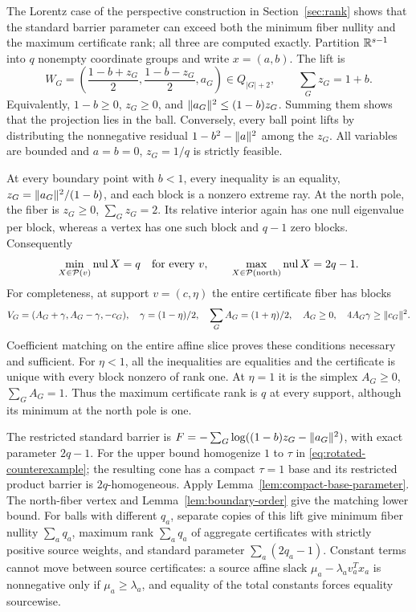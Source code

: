 \begin{example}
\label{ex:rotated-nullity}
The Lorentz case of the perspective construction in
Section~\ref{sec:rank} shows that the standard barrier parameter can
exceed both the minimum fiber nullity and the maximum certificate rank;
all three are computed exactly. Partition
$\mathbb R^{s-1}$ into $q$ nonempty coordinate groups and write $x=(a,b)$.
The lift is
\begin{equation}\label{eq:rotated-counterexample}
 W_G=\left(\frac{1-b+z_G}2,\frac{1-b-z_G}2,a_G\right)\in Q_{|G|+2},
 \qquad\sum_Gz_G=1+b.
\end{equation}
Equivalently, $1-b\geq0$, $z_G\geq0$, and
$\lVert a_G\rVert^2\leq(1-b)z_G$. Summing them shows that the projection lies
in the ball. Conversely, every ball point lifts by distributing the nonnegative residual $1-b^2-\lVert a\rVert^2$
among the $z_G$. All variables are bounded and $a=b=0$, $z_G=1/q$
is strictly feasible.

At every boundary point with $b<1$, every inequality is an equality,
$z_G=\lVert a_G\rVert^2/(1-b)$, and each block is a nonzero extreme ray.
At the north pole, the fiber is $z_G\geq0$, $\sum_Gz_G=2$.
Its relative interior again has one null eigenvalue per block, whereas
a vertex has one such block and $q-1$ zero blocks. Consequently
\[
 \min_{X\in\mathcal P(v)}\operatorname{nul}X=q
 \quad\hbox{for every }v,\qquad
 \max_{X\in\mathcal P(\text{north})}\operatorname{nul}X=2q-1.
\]
For completeness, at support $v=(c,\eta)$ the entire certificate fiber
has blocks
\[
 V_G=(A_G+\gamma,A_G-\gamma,-c_G),\quad
 \gamma=(1-\eta)/2,\quad\sum_GA_G=(1+\eta)/2,\quad
 A_G\geq0,\quad 4A_G\gamma\geq\lVert c_G\rVert^2.
\]
Coefficient matching on the entire affine slice proves these conditions
necessary and sufficient. For $\eta<1$, all the inequalities are equalities
and the certificate is unique with every block nonzero of rank one.
At $\eta=1$ it is the simplex $A_G\geq0$, $\sum_GA_G=1$.
Thus the maximum certificate rank is $q$ at every support, although its
minimum at the north pole is one.

The restricted standard barrier is
$F=-\sum_G\log((1-b)z_G-\lVert a_G\rVert^2)$, with exact parameter $2q-1$.
For the upper bound homogenize $1$ to $\tau$ in
\eqref{eq:rotated-counterexample}; the resulting cone has a compact
$\tau=1$ base and its restricted product barrier is $2q$-homogeneous.
Apply Lemma~\ref{lem:compact-base-parameter}. The north-fiber vertex
and Lemma~\ref{lem:boundary-order} give the matching lower bound.
For balls with different $q_a$, separate copies of this lift give
minimum fiber nullity $\sum_aq_a$, maximum rank $\sum_aq_a$ of aggregate
certificates with strictly positive source weights, and standard
parameter $\sum_a(2q_a-1)$. Constant terms cannot move between source
certificates: a source affine slack
$\mu_a-\lambda_av_a^Tx_a$ is nonnegative only if
$\mu_a\geq\lambda_a$, and equality of the total constants forces
equality sourcewise.
\end{example}

